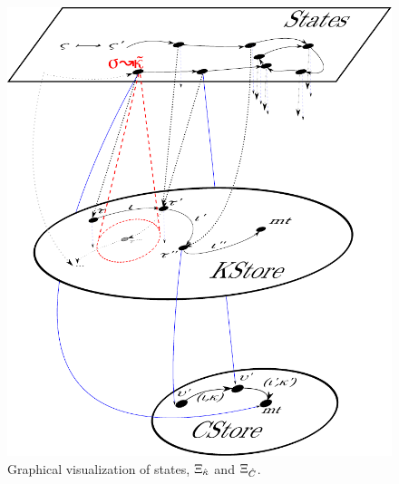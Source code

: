 \begin{figure}
  \centering
  \includegraphics[scale=0.6]{xigraph-approx}
  \caption{Graphical visualization of states, $\Xi_{{\hat{\kappa}}}$ and $\Xi_{{\hat{C}}}$.}
  \label{fig:shiftreset-vis}
\end{figure}

